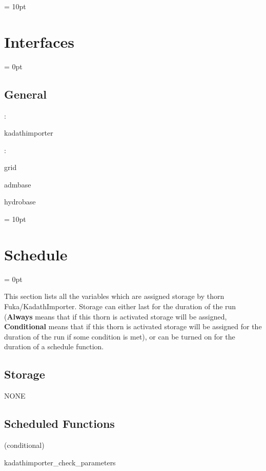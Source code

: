\vspace{0.5cm}\parskip = 10pt 

\section{Interfaces} 


\parskip = 0pt

\vspace{3mm} \subsection*{General}

: 

kadathimporter
\vspace{2mm}

: 

grid

admbase

hydrobase
\vspace{2mm}

\vspace{5mm}\parskip = 10pt 

\section{Schedule} 


\parskip = 0pt


\noindent This section lists all the variables which are assigned storage by thorn Fuka/KadathImporter.  Storage can either last for the duration of the run ({\bf Always} means that if this thorn is activated storage will be assigned, {\bf Conditional} means that if this thorn is activated storage will be assigned for the duration of the run if some condition is met), or can be turned on for the duration of a schedule function.


\subsection*{Storage}NONE
\subsection*{Scheduled Functions}
\vspace{5mm}

   (conditional) 

\hspace{5mm} kadathimporter\_check\_parameters 


